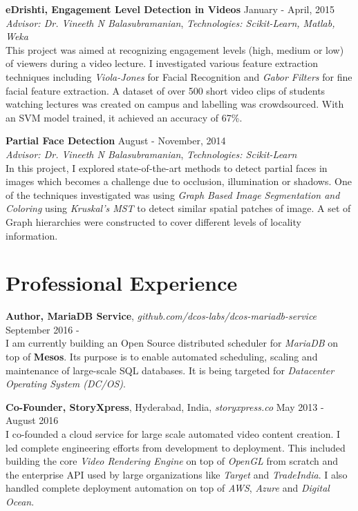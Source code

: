 \documentclass[margin,line]{res}
\begin{document}
\begin{resume}
  \vspace*{-2.5mm}

  {\bf eDrishti, Engagement Level Detection in Videos} \hfill January - April, 2015 \\
  	{\em Advisor: Dr. Vineeth N Balasubramanian}, {\em Technologies: Scikit-Learn, Matlab, Weka} \\
  	This project was aimed at recognizing engagement levels (high, medium or low) of viewers during a video lecture. I investigated various feature extraction techniques including {\it Viola-Jones} for Facial Recognition and {\it Gabor Filters} for fine facial feature extraction. A dataset of over 500 short video clips of students watching lectures was created on campus and labelling was crowdsourced. With an SVM model trained, it achieved an accuracy of 67\%.

  \vspace*{-2.5mm}

  {\bf Partial Face Detection} \hfill August - November, 2014 \\
  	{\em Advisor: Dr. Vineeth N Balasubramanian}, {\em Technologies: Scikit-Learn} \\
    In this project, I explored state-of-the-art methods to detect partial faces in images which becomes a challenge due to occlusion, illumination or shadows. One of the techniques investigated was using {\it Graph Based Image Segmentation and Coloring} using {\it Kruskal's MST} to detect similar spatial patches of image. A set of Graph hierarchies were constructed to cover different levels of locality information.

\section{\sc Professional Experience}

  {\bf Author, MariaDB Service}, {\it github.com/dcos-labs/dcos-mariadb-service} \hfill September 2016 - \\
    I am currently building an Open Source distributed scheduler for {\it MariaDB} on top of {\bf Mesos}. Its purpose is to enable automated scheduling, scaling and maintenance of large-scale SQL databases. It is being targeted for {\it Datacenter Operating System (DC/OS)}.

  \vspace*{-2.5mm}

  {\bf Co-Founder, StoryXpress}, Hyderabad, India, {\it storyxpress.co}  \hfill May 2013 - August 2016 \\
    I co-founded a cloud service for large scale automated video content creation. I led complete engineering efforts from development to deployment. This included building the core {\it Video Rendering Engine} on top of {\it OpenGL} from scratch and the enterprise API used by large organizations like {\it Target} and {\it TradeIndia}. I also handled complete deployment automation on top of {\it AWS}, {\it Azure} and {\it Digital Ocean}.


\end{resume}
\end{document}
